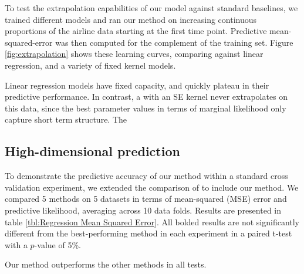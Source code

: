 \documentclass[twoside]{article}
\begin{document}

To test the extrapolation capabilities of our model against standard baselines, we trained different models and ran our method on increasing continuous proportions of the airline data starting at the first time point.
Predictive mean-squared-error was then computed for the complement of the training set.
Figure \ref{fig:extrapolation} shows these learning curves, comparing against linear regression, and a variety of fixed kernel \gp{} models.  

Linear regression models have fixed capacity, and quickly plateau in their predictive performance.
In contrast, a \gp{} with an SE kernel never extrapolates on this data, since the best parameter values in terms of marginal likelihood only capture short term structure.
The 



\subsection{High-dimensional prediction}

To demonstrate the predictive accuracy of our method within a standard cross validation experiment, we extended the comparison of \cite{duvenaud2011additive11} to include our method.
We compared 5 methods on 5 datasets in terms of mean-squared (MSE) error and predictive likelihood, averaging across 10 data folds.
Results are presented in table \ref{tbl:Regression Mean Squared Error}.
All bolded results are not significantly different from the best-performing method in each experiment in a paired t-test with a $p$-value of 5\%.
%
%
%

%
Our method outperforms the other methods in all tests. 
\end{document}
